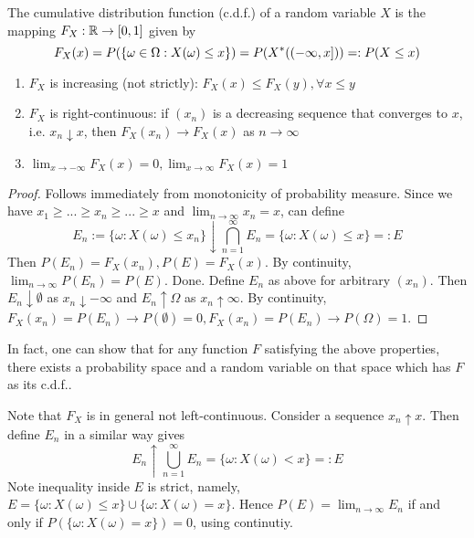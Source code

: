 \documentclass[11pt]{article}
\begin{document}
\begin{definition}
  The cumulative distribution function (c.d.f.) of a random variable \(X\) is the mapping \(F_X:\mathbb{R}\to[0,1]\) given by 
  \[F_X(x)=P(\{\omega\in\Omega:X(\omega)\leq x\})=P(X^*(\left(-\infty,x\right]))=:P(X\leq x)\] 
\end{definition}

\begin{proposition}[Properties of c.d.f.]
  \begin{enumerate}
    \item \(F_X\) is increasing (not strictly): \(F_X(x)\leq F_X(y), \forall x\leq y\)
    \item \(F_X\) is right-continuous: if \((x_n)\) is a decreasing sequence that converges to \(x\), i.e. \(x_n\downarrow x\), then \(F_X(x_n)\to F_X(x)\) as \(n\to\infty\)
    \item \(\lim_{x\to-\infty}F_X(x)=0,\lim_{x\to\infty}F_X(x)=1\)
  \end{enumerate}
\end{proposition}
\begin{proof}
  \subproof{}
  Follows immediately from monotonicity of probability measure.
  \subproof{}
  Since we have \(x_1\geq...\geq x_n\geq...\geq x\) and \(\lim_{n\to\infty}x_n=x\), can define
  \[E_n:=\{\omega:X(\omega)\leq x_n\}\downarrow \bigcap_{n=1}^\infty E_n=\{\omega:X(\omega)\leq x\}=:E\]
  Then \(P(E_n)=F_X(x_n),P(E)=F_X(x)\). By continuity, \(\lim_{n\to\infty}P(E_n)=P(E)\). Done.
  \subproof{}
  Define \(E_n\) as above for arbitrary \((x_n)\). Then \(E_n\downarrow\emptyset\) as \(x_n\downarrow -\infty\) and \(E_n\uparrow\Omega\) as \(x_n\uparrow\infty\). By continuity, \(F_X(x_n)=P(E_n)\to P(\emptyset)=0,F_X(x_n)=P(E_n)\to P(\Omega)=1\). 
\end{proof}
In fact, one can show that for any function \(F\) satisfying the above properties, there exists a probability space and a random variable on that space which has \(F\) as its c.d.f..

\begin{remark}
  Note that \(F_X\) is in general not left-continuous. Consider a sequence \(x_n\uparrow x\). Then define \(E_n\) in a similar way gives 
  \[E_n\uparrow \bigcup_{n=1}^\infty E_n = \{\omega:X(\omega)<x\}=:E\] 
  Note inequality inside \(E\) is strict, namely, \(E=\{\omega:X(\omega)\leq x\}\cup\{\omega:X(\omega)=x\}\). Hence \(P(E)=\lim_{n\to\infty}E_n\) if and only if \(P(\{\omega:X(\omega)=x\})=0\), using continutiy.
\end{remark}
\end{document}
